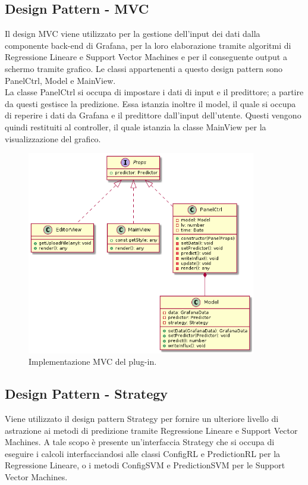 \documentclass[../manuale-sviluppatore.tex]{subfiles}
\begin{document}
\subsection{Design Pattern - MVC}
Il design MVC viene utilizzato per la gestione dell'input dei dati dalla componente back-end di Grafana, per la loro elaborazione tramite algoritmi di Regressione Lineare e Support Vector Machines e per il conseguente output a schermo tramite grafico. Le classi appartenenti a questo design pattern sono PanelCtrl, Model e MainView. \\
La classe PanelCtrl si occupa di impostare i dati di input e il predittore; a partire da questi gestisce la predizione. Essa istanzia inoltre il model, il quale si occupa di reperire i dati da Grafana e il predittore dall'input dell'utente. Questi vengono quindi restituiti al controller, il quale istanzia la classe MainView per la visualizzazione del grafico.

\begin{figure}[H]
  \centering
  \includegraphics[width=10cm]{img/plugin/mvcplugin.png}
  \caption{Implementazione MVC del plug-in.}
\end{figure}

\subsection{Design Pattern - Strategy}
Viene utilizzato il design pattern Strategy per fornire un ulteriore livello di astrazione ai metodi di predizione tramite Regressione Lineare e Support Vector Machines.
A tale scopo è presente un'interfaccia Strategy che si occupa di eseguire i calcoli interfacciandosi alle classi ConfigRL e PredictionRL per la Regressione Lineare,
o i metodi ConfigSVM e PredictionSVM per le Support Vector Machines. \\
\end{document}
